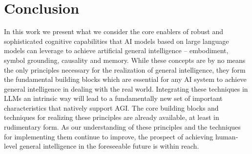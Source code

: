 \documentclass[10pt,journal,compsoc]{IEEEtran}
\begin{document}
	\section{Conclusion}
	In this work we present what we consider the core enablers of robust and sophisticated cognitive capabilities that AI models based on large language models can leverage to achieve artificial general intelligence – embodiment, symbol grounding, causality and memory. While these concepts are by no means the only principles necessary for the realization of general intelligence, they form the fundamental building blocks which are essential for any AI system to achieve general intelligence in dealing with the real world. Integrating these techniques in LLMs an intrinsic way will lead to a fundamentally new set of important characteristics that natively support AGI. The core building blocks and techniques for realizing these principles are already available, at least in rudimentary form. As our understanding of these principles and the techniques for implementing them continue to improve, the prospect of achieving human-level general intelligence in the foreseeable future is within reach.  
	
	
	
	
\end{document}
